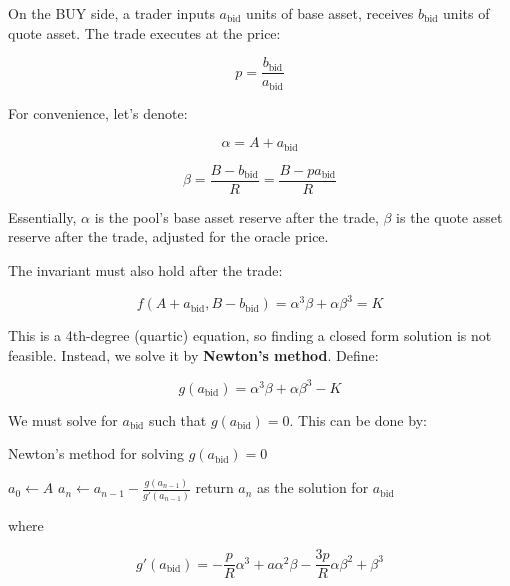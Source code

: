 \documentclass{article}
\begin{document}
On the BUY side, a trader inputs $a_{\mathrm{bid}}$ units of base asset, receives $b_{\mathrm{bid}}$ units of quote asset. The trade executes at the price:

\begin{equation}
  p = \frac{b_{\mathrm{bid}}}{a_{\mathrm{bid}}}
\end{equation}

For convenience, let's denote:

\begin{equation}
  \alpha = A + a_{\mathrm{bid}}
\end{equation}

\begin{equation}
  \beta = \frac{B - b_{\mathrm{bid}}}{R} = \frac{B - p a_{\mathrm{bid}}}{R}
\end{equation}

Essentially, $\alpha$ is the pool's base asset reserve after the trade, $\beta$ is the quote asset reserve after the trade, adjusted for the oracle price.

The invariant must also hold after the trade:

\begin{equation}
  f(A + a_{\mathrm{bid}}, B - b_{\mathrm{bid}}) = \alpha^3 \beta + \alpha \beta^3 = K
\end{equation}

This is a 4th-degree (quartic) equation, so finding a closed form solution is not feasible. Instead, we solve it by \textbf{Newton's method}. Define:

\begin{equation}
  g(a_{\mathrm{bid}}) = \alpha^3 \beta + \alpha \beta^3 - K
\end{equation}

We must solve for $a_{\mathrm{bid}}$ such that $g(a_{\mathrm{bid}}) = 0$. This can be done by:

\begin{algorithm}
  \caption{Newton's method for solving $g(a_{\mathrm{bid}}) = 0$}
  \begin{algorithmic}
    \State $a_0 \gets A$
    \State $a_n \gets a_{n-1} - \frac{g(a_{n-1})}{g'(a_{n-1})}$
    \State return $a_n$ as the solution for $a_{\mathrm{bid}}$
    \EndIf
    \EndFor
  \end{algorithmic}
\end{algorithm}

where

\begin{equation}
  g'(a_{\mathrm{bid}}) = -\frac{p}{R} \alpha^3 + a \alpha^2 \beta - \frac{3p}{R} \alpha \beta^2 + \beta^3
\end{equation}
\end{document}
